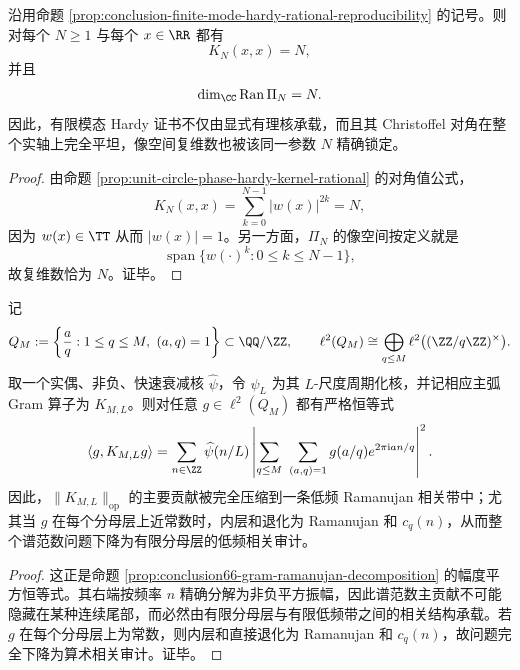 \begin{corollary}\label{cor:conclusion-finite-mode-hardy-flat-diagonal-exact-rank}
沿用命题 \ref{prop:conclusion-finite-mode-hardy-rational-reproducibility} 的记号。则对每个 \(N\ge 1\) 与每个 \(x\in\RR\) 都有
\[
K_N(x,x)=N,
\]
并且
\[
\dim_{\CC}\operatorname{Ran}\Pi_N=N.
\]
因此，有限模态 Hardy 证书不仅由显式有理核承载，而且其 Christoffel 对角在整个实轴上完全平坦，像空间复维数也被该同一参数 \(N\) 精确锁定。
\end{corollary}
\begin{proof}
由命题 \ref{prop:unit-circle-phase-hardy-kernel-rational} 的对角值公式，
\[
K_N(x,x)=\sum_{k=0}^{N-1}|w(x)|^{2k}=N,
\]
因为 \(w(x)\in\TT\) 从而 \(|w(x)|=1\)。另一方面，\(\Pi_N\) 的像空间按定义就是
\[
\operatorname{span}\{w(\cdot)^k:0\le k\le N-1\},
\]
故复维数恰为 \(N\)。证毕。
\end{proof}

\begin{theorem}\label{thm:conclusion-majorarc-gram-ramanujan-localization}
记
\[
Q_M:=\left\{\frac aq:1\le q\le M,\ (a,q)=1\right\}\subset \QQ/\ZZ,
\qquad
\ell^2(Q_M)\cong \bigoplus_{q\le M}\ell^2\bigl((\ZZ/q\ZZ)^\times\bigr).
\]
取一个实偶、非负、快速衰减核 \(\widehat\psi\)，令 \(\psi_L\) 为其 \(L\)-尺度周期化核，并记相应主弧 Gram 算子为 \(K_{M,L}\)。则对任意 \(g\in\ell^2(Q_M)\) 都有严格恒等式
\[
\langle g,K_{M,L}g\rangle
=
\sum_{n\in\ZZ}\widehat\psi(n/L)
\left|
\sum_{q\le M}\ \sum_{(a,q)=1}g(a/q)e^{2\pi\mathrm{i}an/q}
\right|^2.
\]
因此，\(\|K_{M,L}\|_{\mathrm{op}}\) 的主要贡献被完全压缩到一条低频 Ramanujan 相关带中；尤其当 \(g\) 在每个分母层上近常数时，内层和退化为 Ramanujan 和 \(c_q(n)\)，从而整个谱范数问题下降为有限分母层的低频相关审计。
\end{theorem}
\begin{proof}
这正是命题 \ref{prop:conclusion66-gram-ramanujan-decomposition} 的幅度平方恒等式。其右端按频率 \(n\) 精确分解为非负平方振幅，因此谱范数主贡献不可能隐藏在某种连续尾部，而必然由有限分母层与有限低频带之间的相关结构承载。若 \(g\) 在每个分母层上为常数，则内层和直接退化为 Ramanujan 和 \(c_q(n)\)，故问题完全下降为算术相关审计。证毕。
\end{proof}

